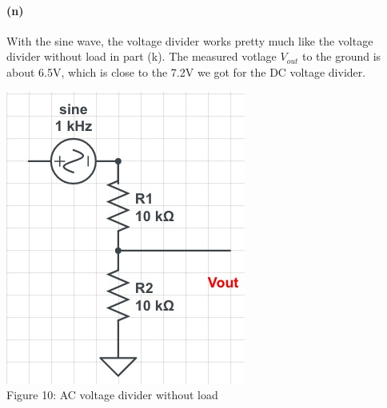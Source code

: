 \documentclass[]{article}
\begin{document}
	\paragraph{ (n)}
With the sine wave, the voltage divider works pretty much like the voltage divider without load in part (k). The measured votlage $V_{out}$ to the ground is about 6.5V, which is close to the 7.2V we got for the DC voltage divider.
\begin{center}
	\includegraphics[scale=0.35]{lab1_ac}\\			
	Figure 10: AC voltage divider without load
\end{center}

	
\end{document}
